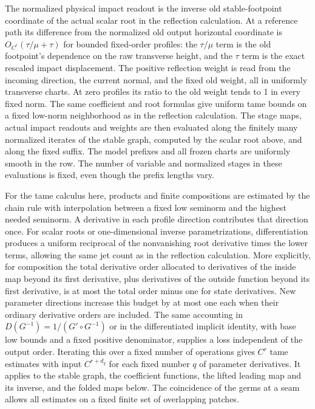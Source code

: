 \documentclass[11pt]{article}
\begin{document}
The normalized physical impact readout is the inverse old stable-footpoint
coordinate of the actual scalar root in the reflection calculation. At a
reference path its difference from the normalized old output horizontal
coordinate is \(O_{C^r}(\tau/\mu+\tau)\) for bounded fixed-order profiles: the
\(\tau/\mu\) term is the old footpoint's dependence on the raw transverse
height, and the \(\tau\) term is the exact rescaled impact displacement. The
positive reflection weight is read from the incoming direction, the current
normal, and the fixed old weight, all in uniformly transverse charts. At zero
profiles its ratio to the old weight tends to 1 in every fixed norm. The same
coefficient and root formulas give uniform tame bounds on a fixed low-norm
neighborhood as in the reflection calculation. The stage maps, actual impact
readouts and weights are then evaluated along the finitely many normalized
iterates of the stable graph, computed by the scalar root above, and along the
fixed suffix. The model prefixes and all frozen charts are uniformly smooth in
the row. The number of variable and normalized stages in these evaluations is
fixed, even though the prefix lengths vary.

For the tame calculus here, products and finite compositions are estimated by
the chain rule with interpolation between a fixed low seminorm and the highest
needed seminorm. A derivative in each profile direction contributes that
direction once. For scalar roots or one-dimensional inverse parametrizations,
differentiation produces a uniform reciprocal of the nonvanishing root derivative
times the lower terms, allowing the same jet count as in the reflection
calculation. More explicitly, for composition the total derivative order
allocated to derivatives of the inside map beyond its first derivative, plus
derivatives of the outside function beyond its first derivative, is at most the
total order minus one for state derivatives. New parameter directions increase
this budget by at most one each when their ordinary derivative orders are
included. The same accounting in \(D(G^{-1})=1/(G'\circ G^{-1})\) or in the
differentiated implicit identity, with base low bounds and a fixed positive
denominator, supplies a loss independent of the output order. Iterating this
over a fixed number of operations gives \(C^r\) tame estimates with input
\(C^{r+d_q}\) for each fixed number \(q\) of parameter derivatives. It applies
to the stable graph, the coefficient functions, the lifted leading map and its
inverse, and the folded maps below. The coincidence of the germs at a seam
allows all estimates on a fixed finite set of overlapping patches.
\end{document}
